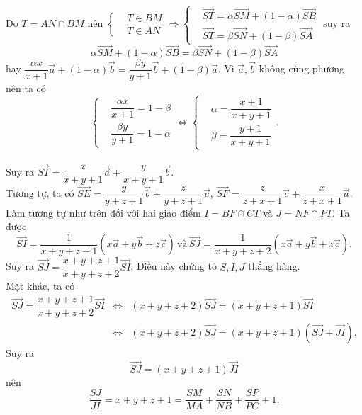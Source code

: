 \begin{bt}
{\begin{itemize}
		Do $T=AN\cap BM$ nên $\left\{\begin{aligned}
		&T\in BM \\
		&T\in AN
		\end{aligned}\right. \Rightarrow \left\{\begin{aligned}
		&\overrightarrow{ST}=\alpha \overrightarrow{SM}+\left(1-\alpha \right)\overrightarrow{SB} \\
		&\overrightarrow{ST}=\beta \overrightarrow{SN}+\left(1-\beta \right)\overrightarrow{SA}
		\end{aligned}\right. $  
		suy ra $$\alpha \overrightarrow{SM}+\left(1-\alpha \right)\overrightarrow{SB}=\beta \overrightarrow{SN}+\left(1-\beta \right)\overrightarrow{SA}$$  
		hay $\dfrac{\alpha x}{x+1}\overrightarrow{a}+\left(1-\alpha \right)\overrightarrow{b}=\dfrac{\beta y}{y+1}\overrightarrow{b}+\left(1-\beta \right)\overrightarrow{a}$.
				Vì $\overrightarrow{a},\overrightarrow{b}$ không cùng phương nên ta có  
				$$\left\{\begin{aligned}
				&\dfrac{\alpha x}{x+1}=1-\beta \\
				&\dfrac{\beta y}{y+1}=1-\alpha
				\end{aligned}\right. \Leftrightarrow \left\{\begin{aligned}
				&\alpha =\dfrac{x+1}{x+y+1} \\
				&\beta =\dfrac{y+1}{x+y+1}
				\end{aligned}\right. .$$ \\
				Suy ra $\overrightarrow{ST}=\dfrac{x}{x+y+1}\overrightarrow{a}+\dfrac{y}{x+y+1}\overrightarrow{b}$. \\
				Tương tự, ta có $\overrightarrow{SE}=\dfrac{y}{y+z+1}\overrightarrow{b}+\dfrac{z}{y+z+1}\overrightarrow{c}$, $\overrightarrow{SF}=\dfrac{z}{z+x+1}\overrightarrow{c}+\dfrac{x}{z+x+1}\overrightarrow{a}$. \\
				Làm tương tự như trên đối với hai giao điểm $I=BF\cap CT$ và $J=NF\cap PT$. Ta được  
				$$\overrightarrow{SI}=\dfrac{1}{x+y+z+1}\left(x\overrightarrow{a}+y\overrightarrow{b}+z\overrightarrow{c}\right)\, \text{và}\,\overrightarrow{SJ}=\dfrac{1}{x+y+z+2}\left(x\overrightarrow{a}+y\overrightarrow{b}+z\overrightarrow{c}\right).$$
				Suy ra $\overrightarrow{SJ}=\dfrac{x+y+z+1}{x+y+z+2}\overrightarrow{SI}$. Điều này chứng tỏ $S,I,J$ thẳng hàng. \\
				Mặt khác, ta có \begin{eqnarray*}
					\overrightarrow{SJ}=\dfrac{x+y+z+1}{x+y+z+2}\overrightarrow{SI} &\Leftrightarrow& (x+y+z+2)\overrightarrow{SJ}=(x+y+z+1)\overrightarrow{SI} \\&\Leftrightarrow& (x+y+z+2)\overrightarrow{SJ}=(x+y+z+1)\left(\overrightarrow{SJ}+\overrightarrow{JI}\right).
				\end{eqnarray*}
				Suy ra $$\overrightarrow{SJ}=(x+y+z+1)\overrightarrow{JI}$$ nên $$\dfrac{SJ}{JI}=x+y+z+1=\dfrac{SM}{MA}+\dfrac{SN}{NB}+\dfrac{SP}{PC}+1.$$ 
		\end{itemize}
		
}\end{bt}

